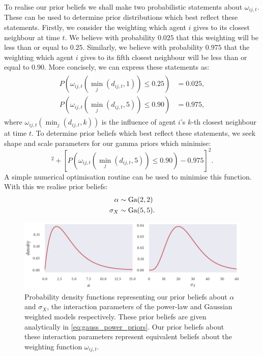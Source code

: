 To realise our prior beliefs we shall make two probabilistic statements about
$\omega_{ij,t}$. These can be used to determine prior distributions which best
reflect these statements. Firstly, we consider the weighting which agent $i$
gives to its closest neighbour at time $t$. We believe with probability $0.025$
that this weighting will be less than or equal to $0.25$. Similarly, we believe
with probability $0.975$ that the weighting which agent $i$ gives to its fifth
closest neighbour will be less than or equal to $0.90$. More concisely, we can
express these statements as:
\begin{align}
  \label{eq:omega_statements}
  \begin{split}
    P(\omega_{ij, t}({\min_j(d_{ij,t}, 1)}) \leq 0.25) & = 0.025, \\
    P(\omega_{ij, t}({\min_j(d_{ij,t}, 5)}) \leq 0.90) & = 0.975,
  \end{split}
\end{align}
where $\omega_{ij, t}({\min_j(d_{ij,t}, k)})$ is the influence of agent $i$'s
$k$-th closest neighbour at time $t$. To determine prior beliefs which best
reflect these statements, we seek shape and scale parameters for our gamma
priors which minimise:
\begin{equation*}
  [P(\omega_{ij, t}({\min_j(d_{ij,t}, 1)}) \leq 0.25) - 0.025]^2
  + [P(\omega_{ij, t}({\min_j(d_{ij,t}, 5)}) \leq 0.90) - 0.975]^2.
\end{equation*}
A simple numerical optimisation routine can be used to minimise this function.
With this we realise prior beliefs:
\begin{align}
  \label{eq:gauss_power_priors}
  \begin{split}
    \alpha   & \sim \textrm{Ga}(2, 2) \\
    \sigma_X & \sim \textrm{Ga}(5, 5).
  \end{split}
\end{align}

\begin{figure}[tbp]
  \includegraphics{gauss_power_priors.pdf}
  \caption{Probability density functions representing our prior beliefs about
    $\alpha$ and $\sigma_X$, the interaction parameters of the power-law and
    Gaussian weighted models respectively. These prior beliefs are given
    analytically in \cref{eq:gauss_power_priors}. Our prior beliefs about
    these interaction parameters represent equivalent beliefs about the
    weighting function $\omega_{ij,t}$.}
  \label{fig:gauss_power_priors}
\end{figure}


